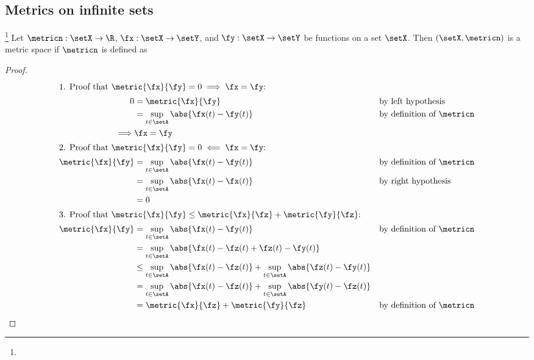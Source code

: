 \subsection{Metrics on infinite sets}
\begin{example}
\footnote{
  }
Let $\metricn:\setX\to\R$, $\fx:\setX\to\setY$, and $\fy:\setX\to\setY$ be functions
on a set $\setX$.
Then $(\setX,\metricn)$ is a metric space if $\metricn$ is defined as
\end{example}
\begin{proof}
\begin{align*}
  \intertext{1. Proof that $\metric{\fx}{\fy}=0 \implies \fx=\fy$:}
    0
      &=   \metric{\fx}{\fy} 
      &&   \text{by left hypothesis}
    \\&=   \sup_{t\in\setA}\abs{\fx(t)-\fy(t)}
      &&   \text{by definition of $\metricn$}
    \\\implies& \fx=\fy
    \\    
  \intertext{2. Proof that $\metric{\fx}{\fy}=0 \impliedby \fx=\fy$:}
    \metric{\fx}{\fy} 
      &=   \sup_{t\in\setA}\abs{\fx(t)-\fy(t)}
      &&   \text{by definition of $\metricn$}
    \\&=   \sup_{t\in\setA}\abs{\fx(t)-\fx(t)}
      &&   \text{by right hypothesis}
    \\&=   0
    \\
  \intertext{3. Proof that $\metric{\fx}{\fy}\le\metric{\fx}{\fz}+\metric{\fy}{\fz}$:}
    \metric{\fx}{\fy} 
      &=   \sup_{t\in\setA}\abs{\fx(t)-\fy(t)}
      &&   \text{by definition of $\metricn$}
    \\&=   \sup_{t\in\setA}\abs{\fx(t)-\fz(t)+\fz(t)-\fy(t)}
    \\&\le \sup_{t\in\setA}\abs{\fx(t)-\fz(t)} + \sup_{t\in\setA}\abs{\fz(t)-\fy(t)}
    \\&=   \sup_{t\in\setA}\abs{\fx(t)-\fz(t)} + \sup_{t\in\setA}\abs{\fy(t)-\fz(t)}
    \\&=   \metric{\fx}{\fz} + \metric{\fy}{\fz} 
      &&   \text{by definition of $\metricn$}
\end{align*}
\end{proof}


